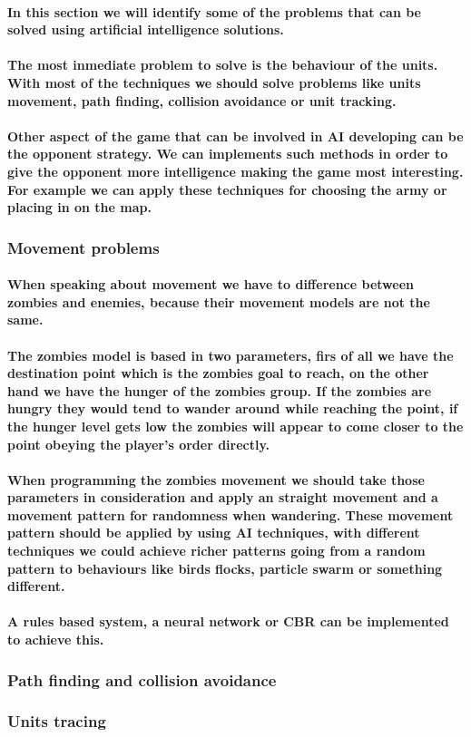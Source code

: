 \documentclass[a4paper,10pt]{article}
\newcommand{\p}[1]{\paragraph{\indent\textnormal{#1}}}
\begin{document}
  \p{In this section we will identify some of the problems that can be solved using artificial intelligence solutions.}

  \p{The most inmediate problem to solve is the behaviour of the units. With most of the techniques we should solve problems like units movement, path finding, collision avoidance or unit tracking.}

  \p{Other aspect of the game that can be involved in AI developing can be the opponent strategy. We can implements such methods in order to give the opponent more intelligence making the game most interesting. For example we can apply these techniques for choosing the army or placing in on the map.}

  \subsubsection{Movement problems}
    
    \p{When speaking about movement we have to difference between zombies and enemies, because their movement models are not the same.}

    \p{The zombies model is based in two parameters, firs of all we have the destination point which is the zombies goal to reach, on the other hand we have the hunger of the zombies group. If the zombies are hungry they would tend to wander around while reaching the point, if the hunger level gets low the zombies will appear to come closer to the point obeying the player's order directly.}

    \p{When programming the zombies movement we should take those parameters in consideration and apply an straight movement and a movement pattern for randomness when wandering. These movement pattern should be applied by using AI techniques, with different techniques we could achieve richer patterns going from a random pattern to behaviours like birds flocks, particle swarm or something different.}

    \p{A rules based system, a neural network or CBR can be implemented to achieve this.}

   \subsubsection{Path finding and collision avoidance}

   \subsubsection{Units tracing}
\end{document}
